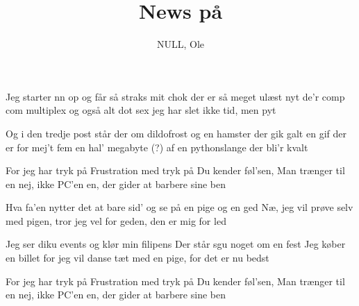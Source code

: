 \documentclass[a4paper,11pt]{article}
\title{News på}
\author{NULL, Ole}
\begin{document}
\maketitle

\begin{song}
Jeg starter nn op 
og får så straks mit chok 
der er så meget ulæst nyt 
de'r comp com multiplex 
og også alt dot sex 
jeg har slet ikke tid, men pyt

\bigskip

Og i den tredje post 
står der om dildofrost 
og en hamster der gik galt 
en gif der er for mej't 
fem en hal' megabyte (?) 
af en pythonslange der bli'r kvalt

\bigskip

For jeg har tryk på 
Frustration med tryk på 
Du kender føl'sen, 
Man trænger til en 
nej, ikke PC'en 
en, der gider at barbere sine ben

\bigskip

Hva fa'en nytter det 
at bare sid' og se 
på en pige og en ged 
Næ, jeg vil prøve selv 
med pigen, tror jeg vel 
for geden, den er mig for led

\bigskip

Jeg ser diku events 
og klør min filipens
Der står sgu noget om en fest 
Jeg køber en billet 
for jeg vil danse tæt 
med en pige, for det er nu bedst 

\bigskip

For jeg har tryk på 
Frustration med tryk på 
Du kender føl'sen, 
Man trænger til en 
nej, ikke PC'en 
en, der gider at barbere sine ben

\end{song}
\end{document}
